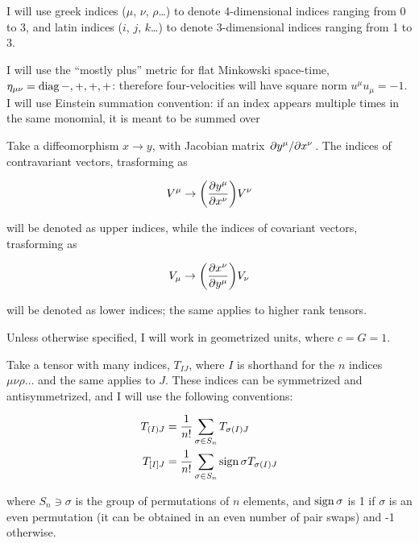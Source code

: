 \documentclass[main.tex]{subfiles}
\begin{document}
I will use greek indices ($\mu$, $\nu$, $\rho$\dots) to denote 4-dimensional indices ranging from 0 to 3, and latin indices ($i$, $j$, $k$\dots) to denote 3-dimensional indices ranging from 1 to 3.

I will use the ``mostly plus'' metric for flat Minkowski space-time, $\eta_{\mu \nu} = \operatorname{diag}{-, +, +, +}$: therefore four-velocities will have square norm \(u^\mu u_\mu = -1\).
I will use Einstein summation convention: if an index appears multiple times in the same monomial, it is meant to be summed over

Take a diffeomorphism $x \rightarrow y$, with Jacobian matrix $\pdv*{y^\mu}{x^\nu}$.
The indices of contravariant vectors, trasforming as

\begin{equation}
    V^\mu \rightarrow \qty( \pdv{y^\mu}{x^\nu})  V^\nu
\end{equation}

will be denoted as upper indices, while the indices of covariant vectors, trasforming as

\begin{equation}
V_\mu \rightarrow \qty( \pdv{x^\nu}{y^\mu})  V_\nu
\end{equation}

will be denoted as lower indices; the same applies to higher rank tensors.

Unless otherwise specified, I will work in geometrized units, where $c = G = 1$.

Take a tensor with many indices, $T_{IJ}$, where $I$ is shorthand for the $n$ indices $\mu \nu \rho \dots$ and the same applies to $J$. These indices can be symmetrized and antisymmetrized, and I will use the following conventions:

\begin{align}
    T_{(I)J} &= \frac{1}{n!} \sum_{\sigma \in S_n} T_{\sigma(I)J} \\
    T_{[I]J} &= \frac{1}{n!} \sum_{\sigma \in S_n} \sign{\sigma} T_{\sigma(I)J}
\end{align}

where $S_n \ni \sigma $ is the group of permutations of $n$ elements, and $\operatorname{sign}{\sigma}$ is 1 if $\sigma$ is an even permutation (it can be obtained in an even number of pair swaps) and -1 otherwise.
\end{document}
